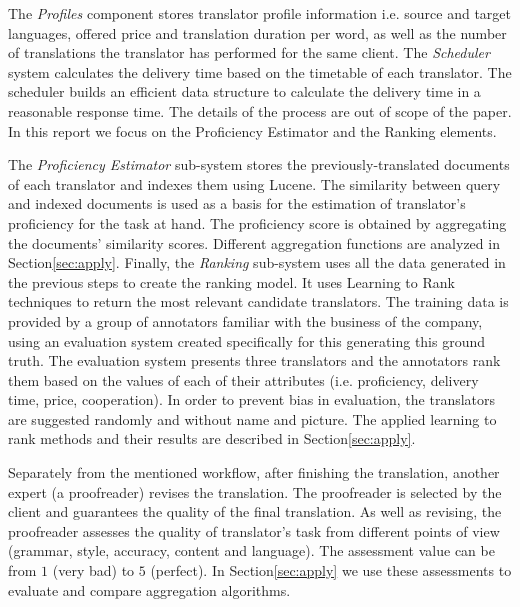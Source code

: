 The \textit{Profiles} component stores translator profile information i.e. source and target languages, offered price and translation duration per word, as well as the number of translations the translator has performed for the same client. The \textit{Scheduler} system calculates the delivery time based on the timetable of each translator. The scheduler builds an efficient data structure to calculate the delivery time in a reasonable response time. The details of the process are out of scope of the paper. In this report we focus on the Proficiency Estimator and the Ranking elements. 

The \textit{Proficiency Estimator} sub-system stores the previously-translated documents of each translator and indexes them using Lucene. The similarity between query and indexed documents is used as a basis for the estimation of translator's proficiency for the task at hand. The proficiency score is obtained by aggregating the documents' similarity scores. Different aggregation functions are analyzed in Section\ref{sec:apply}. Finally, the \textit{Ranking} sub-system uses all the data generated in the previous steps to create the ranking model. It uses Learning to Rank techniques to return the most relevant candidate translators. The training data is provided by a group of annotators  familiar with the business of the company, using an evaluation system created specifically for this generating this ground truth. The evaluation system presents three translators and the annotators rank them based on the values of each of their attributes (i.e. proficiency, delivery time, price, cooperation). In order to prevent bias in evaluation, the translators are suggested randomly and without name and picture. The applied learning to rank methods and their results are described in Section\ref{sec:apply}. 


Separately from the mentioned workflow, after finishing the translation, another expert (a  proofreader) revises the translation. The proofreader is selected by the client and guarantees the quality of the final translation. As well as revising, the proofreader assesses the quality of translator's task from different points of view (grammar, style, accuracy, content and language). The assessment value can be from $1$ (very bad) to $5$ (perfect). In Section\ref{sec:apply} we use these assessments to evaluate and compare aggregation algorithms.
